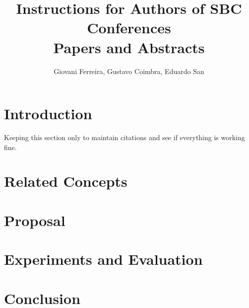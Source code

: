 \documentclass[12pt]{article}
\title{Instructions for Authors of SBC Conferences\\ Papers and Abstracts}
\author{Giovani Ferreira\inst{1}, Gustavo Coimbra\inst{1}, Eduardo San\inst{1} }
\begin{document}
 

\maketitle

\begin{abstract}
\end{abstract}
     
\begin{resumo} 
\end{resumo}


\section{Introduction}

Keeping this section only to maintain citations and see if everything 
is working fine. \cite{knuth:84} \cite{boulic:91} \cite{smith:99}

\section{Related Concepts} \label{sec:firstpage}

\section{Proposal}

\section{Experiments and Evaluation}

\section{Conclusion}\label{sec:figs}



\end{document}
